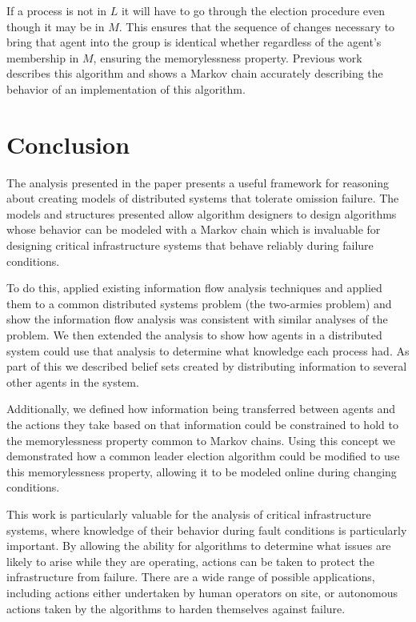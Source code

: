 If a process is not in $L$ it will have to go through the election procedure even though it may be in $M$. This ensures that the sequence of changes necessary to bring that agent into the group is identical whether regardless of the agent's membership in $M$, ensuring the memorylessness property. Previous work \cite{JOURNAL} describes this algorithm and shows a Markov chain accurately describing the behavior of an implementation of this algorithm.

\section{Conclusion}

The analysis presented in the paper presents a useful framework for reasoning about creating models of distributed systems that tolerate omission failure. The models and structures presented allow algorithm designers to design algorithms whose behavior can be modeled with a Markov chain which is invaluable for designing critical infrastructure systems that behave reliably during failure conditions.

To do this, applied existing information flow analysis techniques and applied them to a common distributed systems problem (the two-armies problem) and show the information flow analysis was consistent with similar analyses of the problem. We then extended the analysis to show how agents in a distributed system could use that analysis to determine what knowledge each process had. As part of this we described belief sets created by distributing information to several other agents in the system.

Additionally, we defined how information being transferred between agents and the actions they take based on that information could be constrained to hold to the memorylessness property common to Markov chains. Using this concept we demonstrated how a common leader election algorithm could be modified to use this memorylessness property, allowing it to be modeled online during changing conditions.

This work is particularly valuable for the analysis of critical infrastructure systems, where knowledge of their behavior during fault conditions is particularly important. By allowing the ability for algorithms to determine what issues are likely to arise while they are operating, actions can be taken to protect the infrastructure from failure. There are a wide range of possible applications, including actions either undertaken by human operators on site, or autonomous actions taken by the algorithms to harden themselves against failure.

